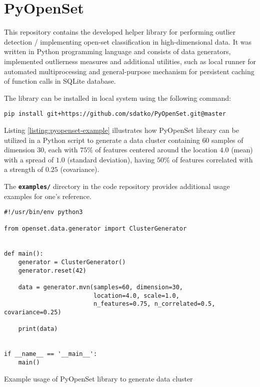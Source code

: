 \section{PyOpenSet}
\label{section:pyopenset}

This repository contains the developed helper library for performing outlier detection / implementing open-set classification in high-dimensional data. It was written in Python programming language and consists of data generators, implemented outlierness measures and additional utilities, such as local runner for automated multiprocessing and general-purpose mechanism for persistent caching of function calls in SQLite database.

The library can be installed in local system using the following command:
\vspace{-\parskip}
\begin{verbatim}
pip install git+https://github.com/sdatko/PyOpenSet.git@master
\end{verbatim}

Listing \ref{listing:pyopenset-example} illustrates how PyOpenSet library can be utilized in a Python script to generate a data cluster containing $60$ samples of dimension $30$, each with $75\%$ of features centered around the location $4.0$ (mean) with a spread of $1.0$ (standard deviation), having $50\%$ of features correlated with a strength of $0.25$ (covariance).

The \texttt{\textbf{examples/}} directory in the code repository provides additional usage examples for one's reference.

\begin{listing}[t]
    \begin{verbatim}
#!/usr/bin/env python3

from openset.data.generator import ClusterGenerator


def main():
    generator = ClusterGenerator()
    generator.reset(42)

    data = generator.mvn(samples=60, dimension=30,
                         location=4.0, scale=1.0,
                         n_features=0.75, n_correlated=0.5, covariance=0.25)

    print(data)


if __name__ == '__main__':
    main()
    \end{verbatim}
    \caption{Example usage of PyOpenSet library to generate data cluster}
    \label{listing:pyopenset-example}
\end{listing}
